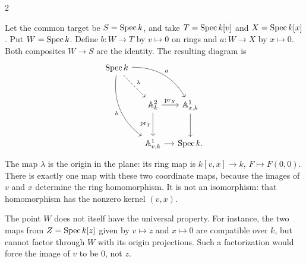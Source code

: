 \documentclass[12pt]{memoir}
\begin{document}
\begin{multicols}{2}
\begin{Ex}\label{ex:originplane}
Let the common target be $S=\operatorname{Spec} k$, and take
$T=\operatorname{Spec} k[v]$ and $X=\operatorname{Spec} k[x]$. Put $W=\operatorname{Spec} k$.
Define $b:W\to T$ by $v\mapsto0$ on rings and $a:W\to X$ by
$x\mapsto0$. Both composites $W\to S$ are the identity. The resulting
diagram is
\[
\begin{tikzcd}[column sep=small,row sep=large]
\Spec k \arrow[drr,bend left,"a"]
 \arrow[ddr,bend right,"b"'] \arrow[dr,dashed,"\lambda"] &&\\
&\bA^2_k \arrow[r,"\pr_X"] \arrow[d,"\pr_T"']
 &\bA^1_{x,k} \arrow[d]\\
&\bA^1_{v,k} \arrow[r] &\Spec k.
\end{tikzcd}
\]
The map $\lambda$ is the origin in the plane: its ring map is
$k[v,x]\to k$, $F\mapsto F(0,0)$. There is exactly one map with
these two coordinate maps, because the images of $v$ and $x$ determine
the ring homomorphism. It is not an isomorphism: that homomorphism has
the nonzero kernel $(v,x)$.

The point $W$ does not itself have the universal property. For instance,
the two maps from $Z=\operatorname{Spec} k[z]$ given by $v\mapsto z$ and
$x\mapsto0$ are compatible over $k$, but cannot factor through $W$
with its origin projections. Such a factorization would force the
image of $v$ to be $0$, not $z$.
\end{Ex}


\end{multicols}
\end{document}
